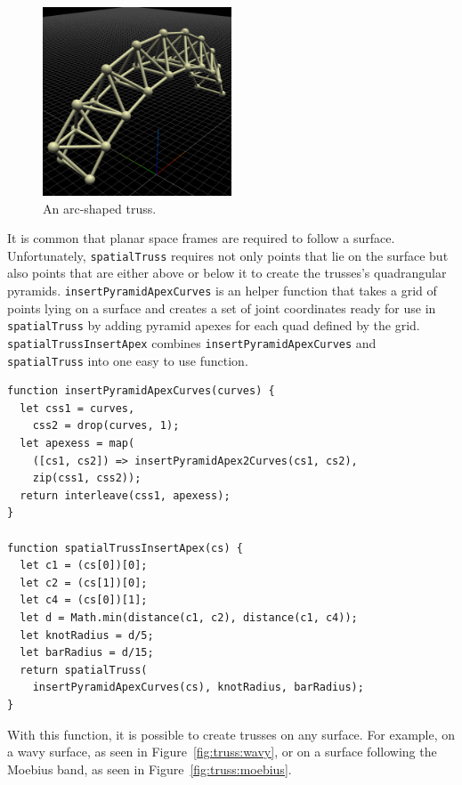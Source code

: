 \begin{figure}
  \centering
  \includegraphics[width=0.5\textwidth]{./images/detail_examples/arc_truss_crop}
  \caption{An arc-shaped truss.}
  \label{fig:arc:truss}
\end{figure}

It is common that planar space frames are required to follow a surface.
Unfortunately, {\tt spatialTruss} requires not only points that lie on the surface but also points that are either above or below it to create the trusses's quadrangular pyramids.
{\tt insertPyramidApexCurves} is an helper function that takes a grid of points lying on a surface and creates a set of joint coordinates ready for use in {\tt spatialTruss} by adding pyramid apexes for each quad defined by the grid.
{\tt spatialTrussInsertApex} combines {\tt insertPyramidApexCurves} and {\tt spatialTruss} into one easy to use function.

\begin{verbatim}
function insertPyramidApexCurves(curves) {
  let css1 = curves,
    css2 = drop(curves, 1);
  let apexess = map(
    ([cs1, cs2]) => insertPyramidApex2Curves(cs1, cs2),
    zip(css1, css2));
  return interleave(css1, apexess);
}

function spatialTrussInsertApex(cs) {
  let c1 = (cs[0])[0];
  let c2 = (cs[1])[0];
  let c4 = (cs[0])[1];
  let d = Math.min(distance(c1, c2), distance(c1, c4));
  let knotRadius = d/5;
  let barRadius = d/15;
  return spatialTruss(
    insertPyramidApexCurves(cs), knotRadius, barRadius);
}
\end{verbatim}

With this function, it is possible to create trusses on any surface.
For example, on a wavy surface, as seen in Figure~\ref{fig:truss:wavy}, or on a surface following the Moebius band, as seen in Figure~\ref{fig:truss:moebius}.


